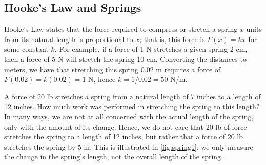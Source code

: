 \subsection{Hooke's Law and Springs}

Hooke's Law states that the force required to compress or stretch a spring $x$ units from its natural length is proportional to $x$; that is, this force is $F(x) = kx$ for some constant $k$. For example, if a force of 1 N stretches a given spring 2 cm, then a force of 5 N will stretch the spring 10 cm. Converting the distances to meters, we have that stretching this spring 0.02 m requires a force of $F(0.02) = k(0.02) = 1$ N, hence $k = 1/0.02 = 50$ N/m. 

\begin{example}\label{ex_spring1}%
A force of 20 lb stretches a spring from a natural length of 7 inches to a length of 12 inches. How much work was performed in stretching the spring to this length?
\solution
In many ways, we are not at all concerned with the actual length of the spring, only with the amount of its change. Hence, we do not care that 20 lb of force stretches the spring to a length of 12 inches, but rather that a force of 20 lb stretches the spring by 5 in. This is illustrated in \autoref{fig:spring1}; we only measure the change in the spring's length, not the overall length of the spring.


\end{example}
